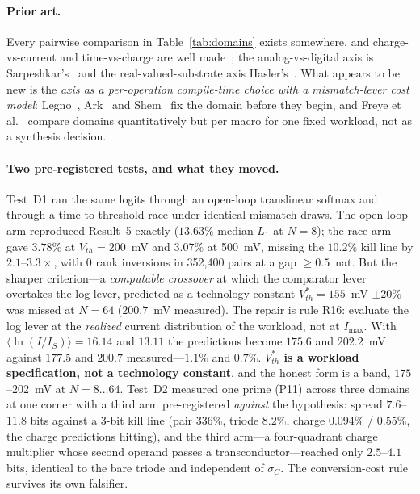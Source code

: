 \documentclass[11pt]{article}
\begin{document}
\paragraph{Prior art.} Every pairwise comparison in Table~\ref{tab:domains} exists somewhere, and charge-vs-current and time-vs-charge are well made~\cite{capram2021,valavi2019,freye2024}; the analog-vs-digital axis is Sarpeshkar's~\cite{sarpeshkar1998} and the real-valued-substrate axis Hasler's~\cite{hasler2020}. What appears to be new is the \textit{axis as a per-operation compile-time choice with a mismatch-lever cost model}: Legno~\cite{legno2020}, Ark~\cite{ark2024} and Shem~\cite{shem2024} fix the domain before they begin, and Freye et al.~\cite{freye2024} compare domains quantitatively but per macro for one fixed workload, not as a synthesis decision.

\paragraph{Two pre-registered tests, and what they moved.} Test~D1 ran the same logits through an open-loop translinear softmax and through a time-to-threshold race under identical mismatch draws. The open-loop arm reproduced Result~5 exactly ($13.63\%$ median $L_1$ at $N=8$); the race arm gave $3.78\%$ at $V_{th} = 200$~mV and $3.07\%$ at 500~mV, missing the $10.2\%$ kill line by $2.1$--$3.3\times$, with 0 rank inversions in 352{,}400 pairs at a gap $\ge 0.5$~nat. But the sharper criterion---a \textit{computable crossover} at which the comparator lever overtakes the log lever, predicted as a technology constant $V_{th}^\ast = 155$~mV $\pm20\%$---was missed at $N=64$ ($200.7$~mV measured). The repair is rule R16: evaluate the log lever at the \textit{realized} current distribution of the workload, not at $I_{\max}$. With $\langle\ln(I/I_S)\rangle = 16.14$ and $13.11$ the predictions become $175.6$ and $202.2$~mV against $177.5$ and $200.7$ measured---$1.1\%$ and $0.7\%$. \textbf{$V_{th}^\ast$ is a workload specification, not a technology constant}, and the honest form is a band, $175$--$202$~mV at $N=8\ldots64$. Test~D2 measured one prime (P11) across three domains at one corner with a third arm pre-registered \textit{against} the hypothesis: spread $7.6$--$11.8$ bits against a 3-bit kill line (pair $336\%$, triode $8.2\%$, charge $0.094\%$ / $0.55\%$, the charge predictions hitting), and the third arm---a four-quadrant charge multiplier whose second operand passes a transconductor---reached only $2.5$--$4.1$ bits, identical to the bare triode and independent of $\sigma_C$. The conversion-cost rule survives its own falsifier.
\end{document}
